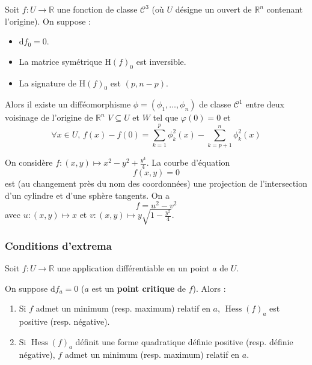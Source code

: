 	\begin{lemma}[Morse]
		Soit $f : U \rightarrow \mathbb{R}$ une fonction de classe $\mathcal{C}^3$ (où $U$ désigne un ouvert de $\mathbb{R}^n$ contenant l'origine). On suppose :
		\begin{itemize}
			\item $\mathrm{d} f_0 = 0$.
			\item La matrice symétrique $\mathrm{H} (f)_0$ est inversible.
			\item La signature de $\mathrm{H}(f)_0$ est $(p, n-p)$.
		\end{itemize}
		Alors il existe un difféomorphisme $\phi = (\phi_1, \dots, \phi_n)$ de classe $\mathcal{C}^1$ entre deux voisinage de l'origine de $\mathbb{R}^n$ $V \subseteq U$ et $W$ tel que $\varphi(0) = 0$ et
		\[ \forall x \in U, \, f(x) - f(0) = \sum_{k=1}^p \phi_k^2(x) - \sum_{k=p+1}^n \phi_k^2(x) \]
	\end{lemma}
	
	
	\begin{example}
		On considère $f : (x,y) \mapsto x^2-y^2+\frac{y^4}{4}$. La courbe d'équation
		\[ f(x,y) = 0 \]
		est (au changement près du nom des coordonnées) une projection de l'intersection d'un cylindre et d'une sphère tangents. On a
		\[ f = u^2 - v^2 \]
		avec $u : (x,y) \mapsto x$ et $v : (x,y) \mapsto y \sqrt{1-\frac{y^2}{4}}$.
	\end{example}
	
	\subsubsection{Conditions d'extrema}
	
	Soit $f : U \rightarrow \mathbb{R}$ une application différentiable en un point $a$ de $U$.
	
	
	\begin{theorem}
		On suppose $\mathrm{d}f_a = 0$ ($a$ est un \textbf{point critique} de $f$). Alors :
		\begin{enumerate}[label=(\roman*)]
			\item Si $f$ admet un minimum (resp. maximum) relatif en $a$, $\operatorname{Hess}(f)_a$ est positive (resp. négative).
			\item Si $\operatorname{Hess}(f)_a$ définit une forme quadratique définie positive (resp. définie négative), $f$ admet un minimum (resp. maximum) relatif en $a$.
		\end{enumerate}
	\end{theorem}
	
